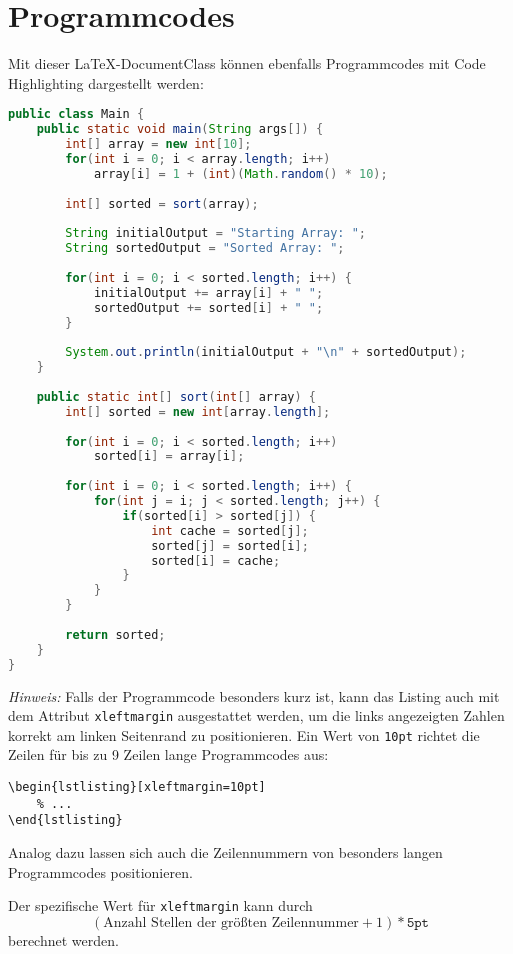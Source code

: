 \documentclass[a4paper]{uulm-document}
\begin{document}
\section{Programmcodes}
Mit dieser \LaTeX -DocumentClass können ebenfalls Programmcodes mit Code Highlighting dargestellt werden:
\begin{lstlisting}[language=Java]
public class Main {
    public static void main(String args[]) {
        int[] array = new int[10];
        for(int i = 0; i < array.length; i++)
            array[i] = 1 + (int)(Math.random() * 10);
        
        int[] sorted = sort(array);
        
        String initialOutput = "Starting Array: ";
        String sortedOutput = "Sorted Array: ";
      
        for(int i = 0; i < sorted.length; i++) {
            initialOutput += array[i] + " ";
            sortedOutput += sorted[i] + " ";
        }
      
        System.out.println(initialOutput + "\n" + sortedOutput);
    }
    
    public static int[] sort(int[] array) {
        int[] sorted = new int[array.length];
        
        for(int i = 0; i < sorted.length; i++)
            sorted[i] = array[i];
            
        for(int i = 0; i < sorted.length; i++) {
            for(int j = i; j < sorted.length; j++) {
                if(sorted[i] > sorted[j]) {
                    int cache = sorted[j];
                    sorted[j] = sorted[i];
                    sorted[i] = cache;
                }
            }
        }
        
        return sorted;
    } 
}
\end{lstlisting}
\textit{Hinweis:} Falls der Programmcode besonders kurz ist, kann das Listing auch mit dem Attribut \texttt{xleftmargin} ausgestattet werden, um die links angezeigten Zahlen korrekt am linken Seitenrand zu positionieren. Ein Wert von \texttt{10pt} richtet die Zeilen für bis zu 9 Zeilen lange Programmcodes aus:
\begin{verbatim}
\begin{lstlisting}[xleftmargin=10pt]
    % ...
\end{lstlisting}
\end{verbatim}
Analog dazu lassen sich auch die Zeilennummern von besonders langen Programmcodes positionieren.

Der spezifische Wert für \texttt{xleftmargin} kann durch
\[
(\text{Anzahl Stellen der größten Zeilennummer} + 1) * \texttt{5pt}
\]
berechnet werden.
\end{document}
